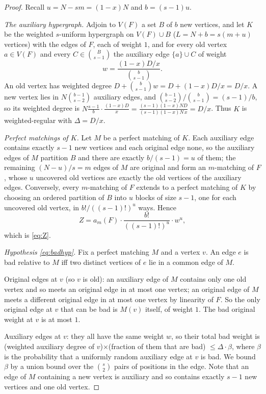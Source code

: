 \documentclass[11pt,a4paper]{article}
\theoremstyle{plain}
\theoremstyle{definition}
\theoremstyle{remark}
\begin{document}
\label{pf:count}
\lemCount*
\begin{proof}
Recall $u=N-sm=(1-x)N$ and $b=(s-1)u$.

\emph{The auxiliary hypergraph.} Adjoin to $V(F)$ a set $B$ of $b$ new vertices, and let $K$ be the weighted $s$-uniform hypergraph on $V(F)\cup B$ ($L=N+b=s(m+u)$ vertices) with the edges of $F$, each of weight $1$, and for every old vertex $a\in V(F)$ and every $C\in\binom{B}{s-1}$ the auxiliary edge $\{a\}\cup C$ of weight
\[
w=\frac{(1-x)D/x}{\binom{b}{s-1}} .
\]
An old vertex has weighted degree $D+\binom b{s-1}w=D+(1-x)D/x=D/x$. A new vertex lies in $N\binom{b-1}{s-2}$ auxiliary edges, and $\binom{b-1}{s-2}/\binom{b}{s-1}=(s-1)/b$, so its weighted degree is $N\frac{s-1}{b}\cdot\frac{(1-x)D}{x}=\frac{(s-1)(1-x)N D}{(s-1)(1-x)N\,x}=D/x$. Thus $K$ is weighted-regular with $\Delta=D/x$.

\emph{Perfect matchings of $K$.} Let $M$ be a perfect matching of $K$. Each auxiliary edge contains exactly $s-1$ new vertices and each original edge none, so the auxiliary edges of $M$ partition $B$ and there are exactly $b/(s-1)=u$ of them; the remaining $(N-u)/s=m$ edges of $M$ are original and form an $m$-matching of $F$, whose $u$ uncovered old vertices are exactly the old vertices of the auxiliary edges. Conversely, every $m$-matching of $F$ extends to a perfect matching of $K$ by choosing an ordered partition of $B$ into $u$ blocks of size $s-1$, one for each uncovered old vertex, in $b!/((s-1)!)^u$ ways. Hence
\[
Z=a_m(F)\cdot\frac{b!}{((s-1)!)^u}\cdot w^u ,
\]
which is \eqref{eq:Z}.

\emph{Hypothesis \eqref{eq:badhyp}.} Fix a perfect matching $M$ and a vertex $v$. An edge $e$ is bad relative to $M$ iff two distinct vertices of $e$ lie in a common edge of $M$.

Original edges at $v$ (so $v$ is old): an auxiliary edge of $M$ contains only one old vertex and so meets an original edge in at most one vertex; an original edge of $M$ meets a different original edge in at most one vertex by linearity of $F$. So the only original edge at $v$ that can be bad is $M(v)$ itself, of weight $1$. The bad original weight at $v$ is at most $1$.

Auxiliary edges at $v$: they all have the same weight $w$, so their total bad weight is (weighted auxiliary degree of $v$)$\times$(fraction of them that are bad) $\le\Delta\cdot\beta$, where $\beta$ is the probability that a uniformly random auxiliary edge at $v$ is bad. We bound $\beta$ by a union bound over the $\binom s2$ pairs of positions in the edge. Note that an edge of $M$ containing a new vertex is auxiliary and so contains exactly $s-1$ new vertices and one old vertex.


\end{proof}
\end{document}
